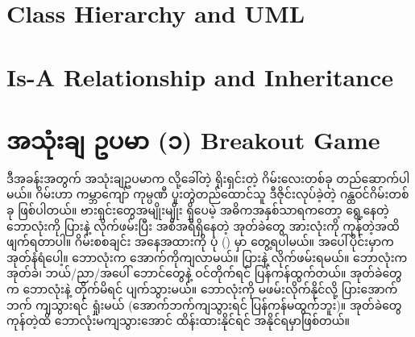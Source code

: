 \section{Class Hierarchy and UML}

\section{Is-A Relationship and Inheritance}


\section{အသုံးချ ဥပမာ (၁) Breakout Game}
ဒီအခန်းအတွက် အသုံးချဥပမာက  လို့ခေါ်တဲ့ ရိုးရှင်းတဲ့ ဂိမ်းလေးတစ်ခု တည်ဆောက်ပါမယ်။  ဂိမ်းဟာ ကမ္ဘာကျော်  ကုမ္ပဏီ ပူးတွဲတည်ထောင်သူ  ဒီဇိုင်းလုပ်ခဲ့တဲ့ ဂန္ထဝင်ဂိမ်းတစ်ခု ဖြစ်ပါတယ်။ ဗားရှင်းတွေအမျိုးမျိုး ရှိပေမဲ့ အဓိကအနှစ်သာရကတော့ ရွေ့နေတဲ့  ဘောလုံးကို  ပြားနဲ့ လိုက်ဖမ်းပြီး အစီအရီရှိနေတဲ့ အုတ်ခဲတွေ အားလုံးကို ကုန်တဲ့အထိ ဖျက်ရတာပါ။  ဂိမ်းစစချင်း အနေအထားကို ပုံ  (\fRefNo{\ref{fig:breakout}}) မှာ တွေ့ရပါမယ်။ အပေါ်ပိုင်းမှာက အုတ်နံရံပေါ့။ ဘောလုံးက အောက်ကိုကျလာမယ်။  ပြားနဲ့ လိုက်ဖမ်းရမယ်။ ဘောလုံးက \fEn{,} အုတ်ခဲ၊ ဘယ်/ညာ/အပေါ် ဘောင်တွေနဲ့ ဝင်တိုက်ရင် ပြန်ကန်ထွက်တယ်။ အုတ်ခဲတွေက ဘောလုံးနဲ့ တိုက်မိရင် ပျက်သွားမယ်။ ဘောလုံးကို မဖမ်းလိုက်နိုင်လို့  ပြားအောက်ဘက် ကျသွားရင် ရှုံးမယ် (အောက်ဘက်ကျသွားရင် ပြန်ကန်မထွက်ဘူး)။ အုတ်ခဲတွေ ကုန်တဲ့ထိ ဘောလုံးမကျသွားအောင် ထိန်းထားနိုင်ရင် အနိုင်ရမှာဖြစ်တယ်။ 

%
\begin{figure}[tbh!]
\caption{} 
\label{fig:breakout}
\end{figure}
%

